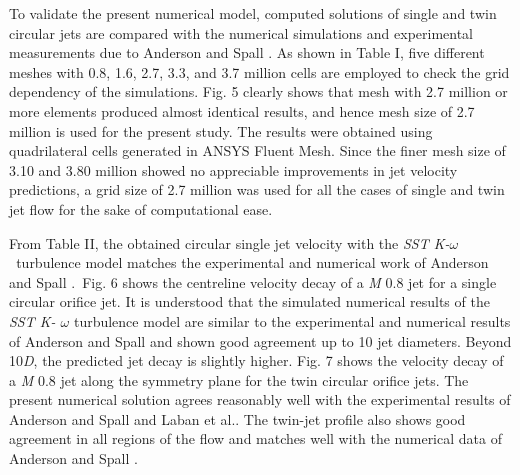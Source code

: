 \documentclass[Afour,sagev,times]{sagej}
\begin{document}
To validate the present numerical model, computed solutions of single and twin circular jets are compared with the numerical simulations and experimental measurements due to Anderson and Spall \cite{anderson2001experimental}. As shown in Table I, five different meshes with 0.8, 1.6, 2.7, 3.3, and 3.7 million cells are employed to check the grid dependency of the simulations. Fig. 5 clearly shows that mesh with 2.7 million or more elements produced almost identical results, and hence mesh size of 2.7 million is used for the present study. The results were obtained using quadrilateral cells generated in ANSYS Fluent Mesh.\textbf{ }Since the finer mesh size of 3.10 and 3.80 million showed no appreciable improvements in jet velocity predictions, a grid size of 2.7 million was used for all the cases of single and twin jet flow for the sake of computational ease. 

From Table II, the obtained circular single jet velocity with the \textit{SST K-$\omega$~}turbulence model matches the experimental and numerical work of Anderson and Spall \cite{anderson2001experimental}.~Fig. 6 shows the centreline velocity decay of a \textit{M} 0.8 jet for a single circular orifice jet. It is understood that the simulated numerical results of the \textit{SST K- $\omega$} turbulence model are similar to the experimental and numerical results of Anderson and Spall \cite{anderson2001experimental} and shown good agreement up to 10 jet diameters. Beyond 10\textit{D}, the predicted jet decay is slightly higher. Fig. 7 shows the velocity decay of a \textit{M} 0.8 jet along the symmetry plane for the twin circular orifice jets. The present numerical solution agrees reasonably well with the experimental results of Anderson and Spall \cite{anderson2001experimental} and Laban et al.\cite{laban2019experimental}.  The twin-jet profile also shows good agreement in all regions of the flow and matches well with the numerical data of Anderson and Spall \cite{anderson2001experimental}. 

\end{document}
